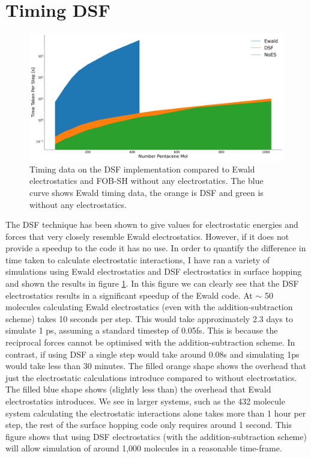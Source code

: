 \section{Timing DSF}
\begin{figure}[htp]
  \includegraphics[width=\textwidth]{./img/ES/SH_timing_wEwald.png}
  \caption{\label{fig:DSF_Timings}Timing data on the DSF implementation compared to Ewald electrostatics and FOB-SH without any electrostatics. The blue curve shows Ewald timing data, the orange is DSF and green is without any electrostatics.}
\end{figure}
\noindent The DSF technique has been shown to give values for electrostatic energies and forces that very closely resemble Ewald electrostatics. However, if it does not provide a speedup to the code it has no use. In order to quantify the difference in time taken to calculate electrostatic interactions, I have ran a variety of simulations using Ewald electrostatics and DSF electrostatics in surface hopping and shown the results in figure \ref{fig:DSF_Timings}. In this figure we can clearly see that the DSF electrostatics results in a significant speedup of the Ewald code. At $\sim$ 50 molecules calculating Ewald electrostatics (even with the addition-subtraction scheme) takes 10 seconds per step. This would take approximately 2.3 days to simulate 1 ps, assuming a standard timestep of 0.05fs. This is because the reciprocal forces cannot be optimised with the addition-subtraction scheme. In contrast, if using DSF a single step would take around 0.08s and simulating 1ps would take less than 30 minutes. The filled orange shape shows the overhead that just the electrostatic calculations introduce compared to without electrostatics. The filled blue shape shows (slightly less than) the overhead that Ewald electrostatics introduces. We see in larger systems, such as the 432 molecule system calculating the electrostatic interactions alone takes more than 1 hour per step, the rest of the surface hopping code only requires around 1 second. This figure shows that using DSF electrostatics (with the addition-subtraction scheme) will allow simulation of around 1,000 molecules in a reasonable time-frame.


